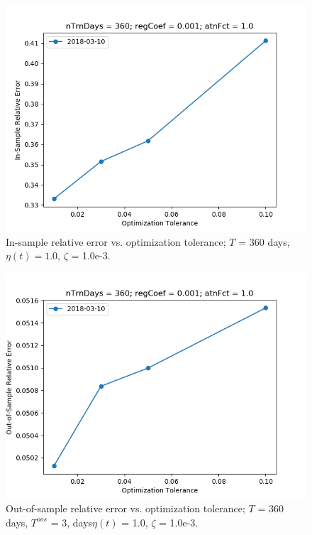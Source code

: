 \documentclass{article}
\begin{document}
\begin{figure}
\includegraphics[scale=0.9,bb=0 0 640 480]{figures/tolerance-sensitivity-error.png}
\caption{In-sample relative error vs. optimization tolerance; $T$ =
  360 days, $\eta(t) = 1.0$, $\zeta$ = 1.0e-3.}
\label{fig:tolerance-sensitivity-error}
\end{figure}

\begin{figure}
\includegraphics[scale=0.9,bb=0 0 640 480]{figures/tolerance-sensitivity-oos-error.png}
\caption{Out-of-sample relative error vs. optimization tolerance; $T$
  = 360 days, $T^{oos}$ = 3, days$\eta(t)$ = 1.0, $\zeta$ = 1.0e-3.}
\label{fig:tolerance-sensitivity-oos-error}
\end{figure}
\end{document}
